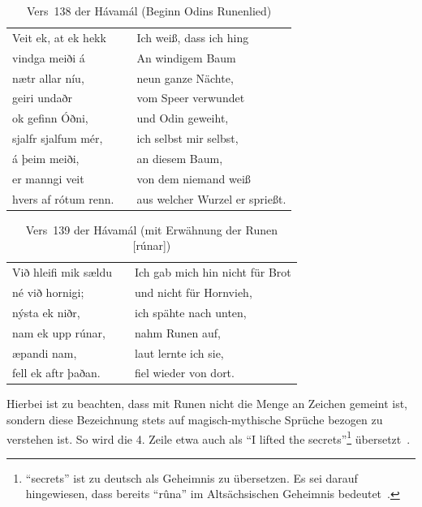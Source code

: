 \documentclass[a4paper]{scrartcl}
\begin{document}
\begin{table}[!ht]
  \begin{center}
    \begin{tabular}{lp{30pt}l}
      Veit ek, at ek hekk   && Ich weiß, dass ich hing \\
      vindga meiði á        && An windigem Baum \\
      nætr allar níu,       && neun ganze Nächte, \\
      geiri undaðr          && vom Speer verwundet \\
      ok gefinn Óðni,       && und Odin geweiht, \\
      sjalfr sjalfum mér,   && ich selbst mir selbst, \\
      á þeim meiði,         && an diesem Baum, \\
      er manngi veit        && von dem niemand weiß \\
      hvers af rótum renn.  && aus welcher Wurzel er sprießt.
    \end{tabular}
    \caption{Vers~138 der Hávamál (Beginn Odins Runenlied)}
  \end{center}
\end{table}
%
\begin{table}[!ht]
  \begin{center}
    \begin{tabular}{lp{30pt}l}
      Við hleifi mik sældu  && Ich gab mich hin nicht für Brot \\
      né við hornigi;       && und nicht für Hornvieh, \\
      nýsta ek niðr,        && ich spähte nach unten, \\
      nam ek upp rúnar,     && nahm Runen auf, \\
      æpandi nam,           && laut lernte ich sie, \\
      fell ek aftr þaðan.   && fiel wieder von dort.
    \end{tabular}
    \caption{Vers~139 der Hávamál (mit Erwähnung der Runen [rúnar])}
  \end{center}
\end{table}

Hierbei ist zu beachten, dass mit Runen nicht die Menge an Zeichen gemeint ist, sondern diese Bezeichnung stets auf magisch-mythische Sprüche bezogen zu verstehen ist. So wird die 4. Zeile etwa auch als \enquote{I lifted the secrets}\footnote{\enquote{secrets} ist zu deutsch als Geheimnis zu übersetzen. Es sei darauf hingewiesen, dass bereits \enquote{rûna} im Altsächsischen Geheimnis bedeutet~\cite[S. 1]{düwel}.} übersetzt~\cite{havamal-vers-139}.
\end{document}
